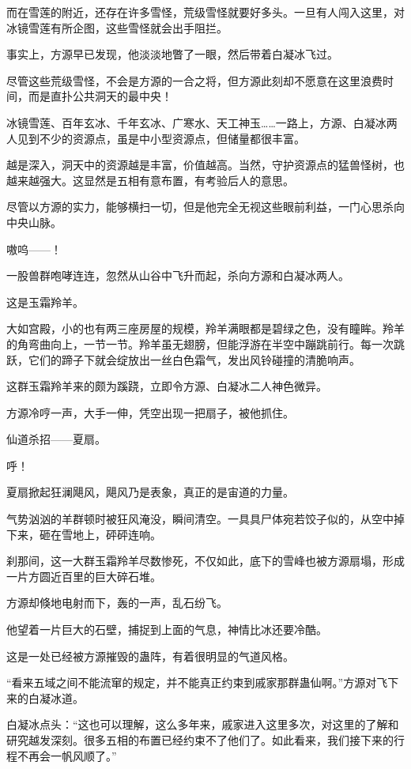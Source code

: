 \begin{this_body}
而在雪莲的附近，还存在许多雪怪，荒级雪怪就要好多头。一旦有人闯入这里，对冰镜雪莲有所企图，这些雪怪就会出手阻拦。

事实上，方源早已发现，他淡淡地瞥了一眼，然后带着白凝冰飞过。

尽管这些荒级雪怪，不会是方源的一合之将，但方源此刻却不愿意在这里浪费时间，而是直扑公共洞天的最中央！

冰镜雪莲、百年玄冰、千年玄冰、广寒水、天工神玉……一路上，方源、白凝冰两人见到不少的资源点，虽是中小型资源点，但储量都很丰富。

越是深入，洞天中的资源越是丰富，价值越高。当然，守护资源点的猛兽怪树，也越来越强大。这显然是五相有意布置，有考验后人的意思。

尽管以方源的实力，能够横扫一切，但是他完全无视这些眼前利益，一门心思杀向中央山脉。

嗷呜——！

一股兽群咆哮连连，忽然从山谷中飞升而起，杀向方源和白凝冰两人。

这是玉霜羚羊。

大如宫殿，小的也有两三座房屋的规模，羚羊满眼都是碧绿之色，没有瞳眸。羚羊的角弯曲向上，一节一节。羚羊虽无翅膀，但能浮游在半空中蹦跳前行。每一次跳跃，它们的蹄子下就会绽放出一丝白色霜气，发出风铃碰撞的清脆响声。

这群玉霜羚羊来的颇为蹊跷，立即令方源、白凝冰二人神色微异。

方源冷哼一声，大手一伸，凭空出现一把扇子，被他抓住。

仙道杀招——夏扇。

呼！

夏扇掀起狂澜飓风，飓风乃是表象，真正的是宙道的力量。

气势汹汹的羊群顿时被狂风淹没，瞬间清空。一具具尸体宛若饺子似的，从空中掉下来，砸在雪地上，砰砰连响。

刹那间，这一大群玉霜羚羊尽数惨死，不仅如此，底下的雪峰也被方源扇塌，形成一片方圆近百里的巨大碎石堆。

方源却倏地电射而下，轰的一声，乱石纷飞。

他望着一片巨大的石壁，捕捉到上面的气息，神情比冰还要冷酷。

这是一处已经被方源摧毁的蛊阵，有着很明显的气道风格。

“看来五域之间不能流窜的规定，并不能真正约束到戚家那群蛊仙啊。”方源对飞下来的白凝冰道。

白凝冰点头：“这也可以理解，这么多年来，戚家进入这里多次，对这里的了解和研究越发深刻。很多五相的布置已经约束不了他们了。如此看来，我们接下来的行程不再会一帆风顺了。”


\end{this_body}
